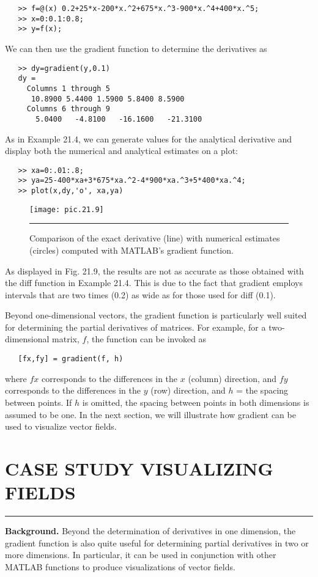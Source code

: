 \documentclass[../main.tex]{subfiles}
\begin{document}
\begin{verbatim}
   >> f=@(x) 0.2+25*x-200*x.^2+675*x.^3-900*x.^4+400*x.^5;
   >> x=0:0.1:0.8;
   >> y=f(x);
\end{verbatim}
We can then use the gradient function to determine the derivatives as
\begin{verbatim}
   >> dy=gradient(y,0.1)
   dy =
     Columns 1 through 5
      10.8900 5.4400 1.5900 5.8400 8.5900
     Columns 6 through 9
       5.0400   -4.8100   -16.1600   -21.3100
\end{verbatim}
As in Example 21.4, we can generate values for the analytical derivative and display both
the numerical and analytical estimates on a plot:
\begin{verbatim}
   >> xa=0:.01:.8;
   >> ya=25-400*xa+3*675*xa.^2-4*900*xa.^3+5*400*xa.^4;
   >> plot(x,dy,'o', xa,ya)
\end{verbatim}
\pagebreak
\begin{figure}[hbt!]
	\centering
	\texttt{[image: pic.21.9]}
	\caption{\textsf{Comparison of the exact derivative (line) with numerical estimates (circles) computed with
MATLAB's gradient function.}} \vspace{0.1in} \hrule 
	\label{pic.21.9}
\end{figure}
\vspace{0.2in}

As displayed in Fig. 21.9, the results are not as accurate as those obtained with the
diff function in Example 21.4. This is due to the fact that gradient employs intervals
that are two times (0.2) as wide as for those used for diff (0.1).

\vspace{0.4in}
Beyond one-dimensional vectors, the gradient function is particularly well suited
for determining the partial derivatives of matrices. For example, for a two-dimensional matrix, $f$, the function can be invoked as
\begin{verbatim}
   [fx,fy] = gradient(f, h)
\end{verbatim}
where $fx$ corresponds to the differences in the $x$ (column) direction, and $fy$ corresponds
to the differences in the $y$ (row) direction, and $h$ = the spacing between points. If $h$ is
omitted, the spacing between points in both dimensions is assumed to be one. In the next
section, we will illustrate how gradient can be used to visualize vector fields.

\vspace{0,6in}
\section{CASE STUDY VISUALIZING FIELDS}
\vspace{0,1in}
\hrule
\vspace{0,1in}
\textbf{Background.} Beyond the determination of derivatives in one dimension, the gradient
function is also quite useful for determining partial derivatives in two or more dimensions.
In particular, it can be used in conjunction with other MATLAB functions to produce visualizations of vector fields.
\end{document}
